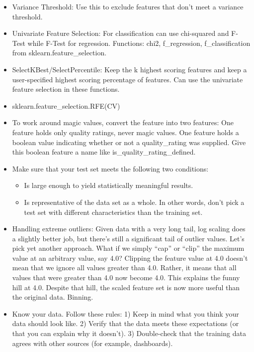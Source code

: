 \documentclass[]{book}
\theoremstyle{definition}
\theoremstyle{definition}
\theoremstyle{definition}
\theoremstyle{remark}
\begin{document}
\begin{itemize}
\item
  Variance Threshold: Use this to exclude features that don't meet a
  variance threshold.
\item
  Univariate Feature Selection: For classification can use chi-squared
  and F-Test while F-Test for regression. Functions: chi2,
  f\_regression, f\_classification from sklearn.feature\_selection.
\item
  SelectKBest/SelectPercentile: Keep the k highest scoring features and
  keep a user-specified highest scoring percentage of features. Can use
  the univariate feature selection in these functions.
\item
  sklearn.feature\_selection.RFE(CV)
\item
  To work around magic values, convert the feature into two features:
  One feature holds only quality ratings, never magic values. One
  feature holds a boolean value indicating whether or not a
  quality\_rating was supplied. Give this boolean feature a name like
  is\_quality\_rating\_defined.
\item
  Make sure that your test set meets the following two conditions:

  \begin{itemize}
  \item
    Is large enough to yield statistically meaningful results.
  \item
    Is representative of the data set as a whole. In other words, don't
    pick a test set with different characteristics than the training
    set.
  \end{itemize}
\item
  Handling extreme outliers: Given data with a very long tail, log
  scaling does a slightly better job, but there's still a significant
  tail of outlier values. Let's pick yet another approach. What if we
  simply ``cap'' or ``clip'' the maximum value at an arbitrary value,
  say 4.0? Clipping the feature value at 4.0 doesn't mean that we ignore
  all values greater than 4.0. Rather, it means that all values that
  were greater than 4.0 now become 4.0. This explains the funny hill at
  4.0. Despite that hill, the scaled feature set is now more useful than
  the original data. Binning.
\item
  Know your data. Follow these rules: 1) Keep in mind what you think
  your data should look like. 2) Verify that the data meets these
  expectations (or that you can explain why it doesn't). 3) Double-check
  that the training data agrees with other sources (for example,
  dashboards).
\end{itemize}
\end{document}

